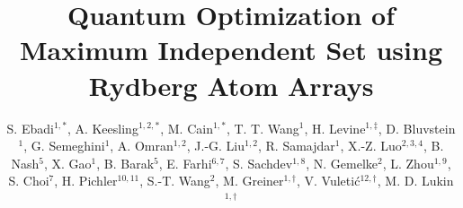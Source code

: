 \documentclass[twocolumn,amssymb,secnumarabic, prl, aps, nofootinbib]{revtex4-1}
\begin{document}
 
	
\title{
	Quantum Optimization of Maximum Independent Set using Rydberg Atom Arrays
}

\author
{S. Ebadi$^{1, \ast}$, A. Keesling$^{1,2, \ast}$, M. Cain$^{1, \ast}$, T. T. Wang$^{1}$, H. Levine$^{1, \ddagger}$,
	D. Bluvstein$^{1}$, G. Semeghini$^{1}$, A. Omran$^{1,2}$,  J.-G. Liu$^{1,2}$,
	R. Samajdar$^{1}$,  X.-Z. Luo$^{2,3,4}$, B. Nash$^{5}$, X. Gao$^{1}$,
	B. Barak$^{5}$, E. Farhi$^{6,7}$, S. Sachdev$^{1,8}$,  N. Gemelke$^2$, L. Zhou$^{1,9}$,
	S. Choi$^{7}$, H. Pichler$^{10,11}$, S.-T. Wang$^{2}$, 
	M. Greiner$^{1,\dagger}$, V. Vuleti\'{c}$^{12,\dagger}$, M. D. Lukin$^{1,\dagger}$}

\end{document}
